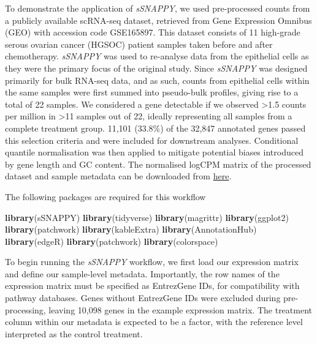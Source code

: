 \documentclass[9pt,a4paper,]{extarticle}
\newenvironment{Shaded}{\begin{snugshade}}{\end{snugshade}}
\newcommand{\FunctionTok}[1]{\textcolor[rgb]{0.13,0.29,0.53}{\textbf{#1}}}
\newcommand{\NormalTok}[1]{#1}
\begin{document}
To demonstrate the application of \emph{sSNAPPY}, we used pre-processed counts from a publicly available scRNA-seq dataset, retrieved from Gene Expression Omnibus (GEO) with accession code GSE165897.
This dataset consists of 11 high-grade serous ovarian cancer (HGSOC) patient samples taken before and after chemotherapy\citep{Zhang2022}.
\emph{sSNAPPY} was used to re-analyse data from the epithelial cells as they were the primary focus of the original study.
Since \emph{sSNAPPY} was designed primarily for bulk RNA-seq data, and as such, counts from epithelial cells within the same samples were first summed into pseudo-bulk profiles, giving rise to a total of 22 samples.
We considered a gene detectable if we observed \textgreater1.5 counts per million in \textgreater11 samples out of 22, ideally representing all samples from a complete treatment group.
11,101 (33.8\%) of the 32,847 annotated genes passed this selection criteria and were included for downstream analyses.
Conditional quantile normalisation\citep{Hansen2012} was then applied to mitigate potential biases introduced by gene length and GC content.
The normalised logCPM matrix of the processed dataset and sample metadata can be downloaded from \href{https://github.com/Wenjun-Liu/F1000_sSNAPPY_manuscript/tree/master/data}{here}.

The following packages are required for this workflow

\begin{Shaded}
\begin{Highlighting}[]
\FunctionTok{library}\NormalTok{(sSNAPPY)}
\FunctionTok{library}\NormalTok{(tidyverse)}
\FunctionTok{library}\NormalTok{(magrittr)}
\FunctionTok{library}\NormalTok{(ggplot2)}
\FunctionTok{library}\NormalTok{(patchwork)}
\FunctionTok{library}\NormalTok{(kableExtra)}
\FunctionTok{library}\NormalTok{(AnnotationHub) }
\FunctionTok{library}\NormalTok{(edgeR)}
\FunctionTok{library}\NormalTok{(patchwork)}
\FunctionTok{library}\NormalTok{(colorspace)}
\end{Highlighting}
\end{Shaded}

To begin running the \emph{sSNAPPY} workflow, we first load our expression matrix and define our sample-level metadata.
Importantly, the row names of the expression matrix must be specified as EntrezGene IDs, for compatibility with pathway databases.
Genes without EntrezGene IDs were excluded during pre-processing, leaving 10,098 genes in the example expression matrix.
The treatment column within our metadata is expected to be a factor, with the reference level interpreted as the control treatment.
\end{document}
